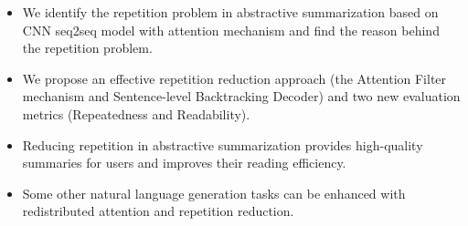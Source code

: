 \documentclass[review]{elsarticle}
\begin{document}
\begin{frontmatter}
\begin{itemize}
\item We identify the repetition problem in abstractive summarization based on CNN seq2seq model with attention mechanism and find the reason behind the repetition problem.
\item We propose an effective repetition reduction approach (the Attention Filter mechanism and Sentence-level Backtracking Decoder) and two new evaluation metrics (Repeatedness and Readability). 
\item Reducing repetition in abstractive summarization provides high-quality summaries for users and improves their reading efficiency.
\item Some other natural language generation tasks can be enhanced with redistributed attention and repetition reduction.
\end{itemize}
\end{frontmatter}
\linenumbers


\end{document}
